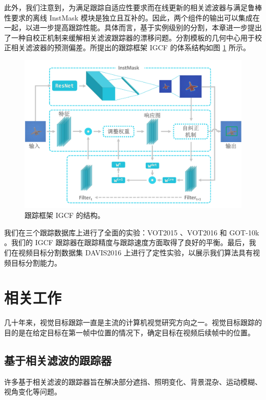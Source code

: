 此外，我们注意到，为满足跟踪自适应性要求而在线更新的相关滤波器与满足鲁棒性要求的离线 InstMask 模块是独立且互补的。因此，两个组件的输出可以集成在一起，以进一步提高跟踪性能。具体而言，基于实例级别的分割，本章进一步提出了一种自校正机制来缓解相关滤波跟踪器的漂移问题。分割模板的几何中心用于校正相关滤波器的预测偏差。所提出的跟踪框架 IGCF 的体系结构如图 \ref{fig:IGCF} 所示。

\begin{figure}
    \centering
    \includegraphics[width=1.0\textwidth]{Img/IGCF/instmask1.pdf}
    \caption{跟踪框架 IGCF 的结构。}
    \label{fig:IGCF}
\end{figure}

我们在三个跟踪数据库上进行了全面的实验：VOT2015 \cite{Kristan2015TheVO}、VOT2016 \cite{Kristan2016TheVO} 和 GOT-10k \cite{GOT-10k}。我们的 IGCF 跟踪器在跟踪精度与跟踪速度方面取得了良好的平衡。最后，我们在视频目标分割数据集 DAVIS2016 \cite{Perazzi2016} 上进行了定性实验，以展示我们算法具有视频目标分割能力。

\section{相关工作}
几十年来，视觉目标跟踪一直是主流的计算机视觉研究方向之一。视觉目标跟踪的目的是在给定目标在第一帧中位置的情况下，确定目标在视频后续帧中的位置。

\subsection{基于相关滤波的跟踪器}
许多基于相关滤波的跟踪器旨在解决部分遮挡、照明变化、背景混杂、运动模糊、视角变化等问题。

